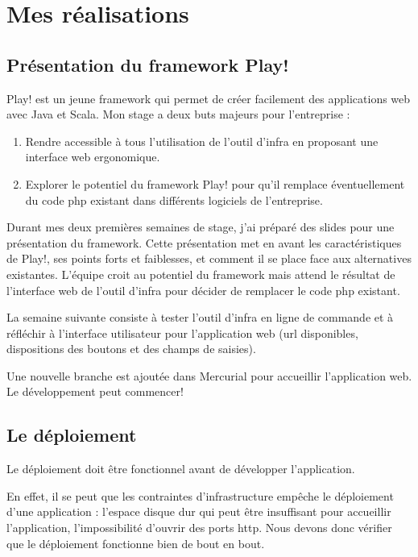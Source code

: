 
\chapter{Mes réalisations}

\section{Présentation du framework Play!}

Play! est un jeune framework qui permet de créer facilement des
applications web avec Java et Scala.
Mon stage a deux buts majeurs pour l'entreprise :

\begin{enumerate}
\item Rendre accessible à tous l'utilisation de l'outil d'infra en proposant
  une interface web ergonomique.
\item Explorer le potentiel du framework Play! pour qu'il remplace
  éventuellement du code php existant dans différents logiciels de
  l'entreprise.
\end{enumerate}

Durant mes deux premières semaines de stage, j'ai préparé des slides pour une
présentation du framework. Cette présentation met en avant les caractéristiques
de Play!, ses points forts et faiblesses, et comment il se place face aux
alternatives existantes.
L'équipe croit au potentiel du framework mais attend le résultat de
l'interface web de l'outil d'infra pour décider de remplacer le code php
existant.

La semaine suivante consiste à tester l'outil d'infra en ligne de
commande et à réfléchir à l'interface utilisateur pour l'application web (url
disponibles, dispositions des boutons et des champs de saisies).

Une nouvelle branche est ajoutée dans Mercurial pour accueillir l'application web.
Le développement peut commencer!


\section{Le déploiement}

Le déploiement doit être fonctionnel avant de développer l'application.

En effet, il se peut que les contraintes d'infrastructure empêche
le déploiement d'une application : l'espace disque dur qui peut être insuffisant
pour accueillir l'application, l'impossibilité d'ouvrir des ports http.
Nous devons donc vérifier que le déploiement fonctionne bien de bout en bout.

